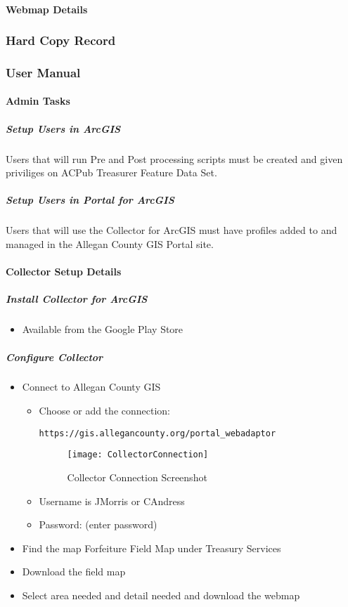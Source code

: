 \documentclass[class=article , crop=false, titlepage, twoside, multi={itemize, figure, verbatim}, float=false]{standalone}
\begin{document}
\clearpage
\paragraph{Webmap Details}

\clearpage
\subsubsection{Hard Copy Record}


\clearpage
\subsubsection{User Manual}

\paragraph{Admin Tasks}

\subparagraph{Setup Users in ArcGIS}Users that will run Pre and Post processing scripts must be created and given priviliges on ACPub Treasurer Feature Data Set.

\subparagraph{Setup Users in Portal for ArcGIS}Users that will use the Collector for ArcGIS must have profiles added to and managed in the Allegan County GIS Portal site.


\paragraph{Collector Setup Details}

\subparagraph{Install Collector for ArcGIS}
\begin{itemize}
\item Available from the Google Play Store
\end{itemize}
\subparagraph{Configure Collector}
\begin{itemize}
\item Connect to Allegan County GIS

\begin{itemize}
\item Choose or add the connection:

\begin{verbatim}
https://gis.allegancounty.org/portal_webadaptor
\end{verbatim}

\begin{figure}
\centering
\texttt{[image: CollectorConnection]}
\caption{Collector Connection Screenshot}
\end{figure}

\item Username is JMorris or CAndress
\item Password: (enter password)
\end{itemize}

\item Find the map Forfeiture Field Map under Treasury Services
\item Download the field map
\item Select area needed and detail needed and download the webmap

\end{itemize}
\end{document}
